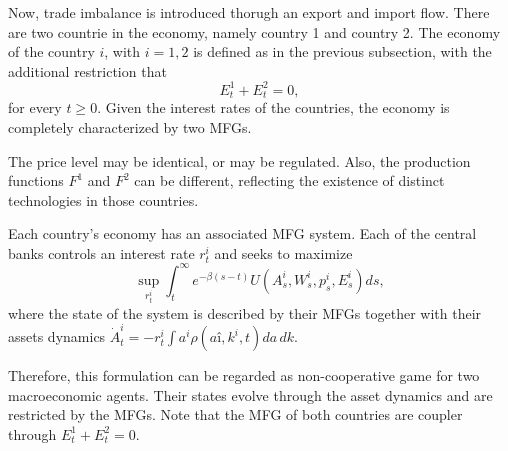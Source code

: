 \documentclass{article}
\begin{document}
Now, trade imbalance is introduced thorugh an export and import flow.
There are two countrie in the economy, namely country 1 and country 2.
The economy of the country $i$, with $i = 1,2$ is defined as in the previous
subsection, with the additional restriction that 
$$
E_t^1 + E_t^2 = 0,
$$
for every $t \geq 0$.
Given the interest rates of the countries, the economy is completely characterized
by two MFGs.

The price level may be identical, or may be regulated. Also, the production
functions $F^1$ and $F^2$ can be different, reflecting the existence of distinct
technologies in those countries. 

Each country's economy has an associated MFG system. Each of the central
banks controls an interest rate $r_t^i$ and seeks to maximize
$$
\sup_{r_t^i} \int^\infty_t e^{-\beta (s - t)} U(A_s^i, W_s^i, p_s^i, E_s^i) ds,
$$
where the state of the system is described by their MFGs together with their
assets dynamics
$\dot A^i_t = - r_t^i \int a^i \rho(aî, k^i, t) da\, dk.$

Therefore, this formulation can be regarded as non-cooperative game for two 
macroeconomic agents. Their states evolve through the asset dynamics and are restricted
by the MFGs. Note that the MFG of both countries are coupler through $E_t^1 + E_t^2 = 0$.
\end{document}
